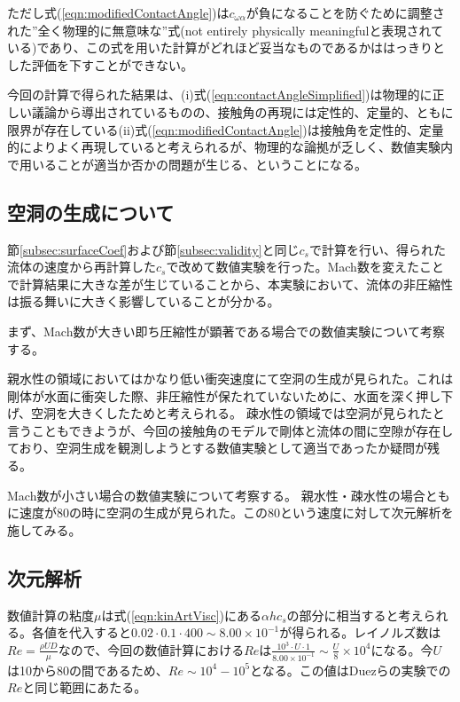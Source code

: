 \documentclass[]{jsarticle}
\begin{document}
ただし式(\ref{eqn:modifiedContactAngle})は$c_{\omega\alpha}$が負になることを防ぐために調整された”全く物理的に無意味な”式(not entirely physically meaningfulと表現されている)であり、この式を用いた計算がどれほど妥当なものであるかははっきりとした評価を下すことができない。

今回の計算で得られた結果は、(i)式(\ref{eqn:contactAngleSimplified})は物理的に正しい議論から導出されているものの、接触角の再現には定性的、定量的、ともに限界が存在している(ii)式(\ref{eqn:modifiedContactAngle})は接触角を定性的、定量的によりよく再現していると考えられるが、物理的な論拠が乏しく、数値実験内で用いることが適当か否かの問題が生じる、ということになる。

\subsection{空洞の生成について}
\label{subsec:discCavityForm}
節\ref{subsec:surfaceCoef}および節\ref{subsec:validity}と同じ$c_s$で計算を行い、得られた流体の速度から再計算した$c_s$で改めて数値実験を行った。Mach数を変えたことで計算結果に大きな差が生じていることから、本実験において、流体の非圧縮性は振る舞いに大きく影響していることが分かる。

まず、Mach数が大きい即ち圧縮性が顕著である場合での数値実験について考察する。

親水性の領域においてはかなり低い衝突速度にて空洞の生成が見られた。これは剛体が水面に衝突した際、非圧縮性が保たれていないために、水面を深く押し下げ、空洞を大きくしたためと考えられる。
疎水性の領域では空洞が見られたと言うこともできようが、今回の接触角のモデルで剛体と流体の間に空隙が存在しており、空洞生成を観測しようとする数値実験として適当であったか疑問が残る。

Mach数が小さい場合の数値実験について考察する。
親水性・疎水性の場合ともに速度が80の時に空洞の生成が見られた。この80という速度に対して次元解析を施してみる。
\subsection{次元解析}
\label{subsec:label}
数値計算の粘度$\mu$は式(\ref{eqn:kinArtVisc})にある$\alpha h c_s$の部分に相当すると考えられる。各値を代入すると$0.02\cdot 0.1 \cdot 400 \sim 8.00\times 10^{-1}$が得られる。レイノルズ数は$Re=\frac{\rho U D}{\mu}$なので、今回の数値計算における$Re$は$\frac{10^3\cdot U \cdot 1}{8.00\times10^{-1}}\sim \frac{U}{8}\times10^4$になる。今$U$は10から80の間であるため、$Re\sim 10^4-10^5$となる。この値はDuezらの実験での$Re$と同じ範囲にあたる。
\end{document}
